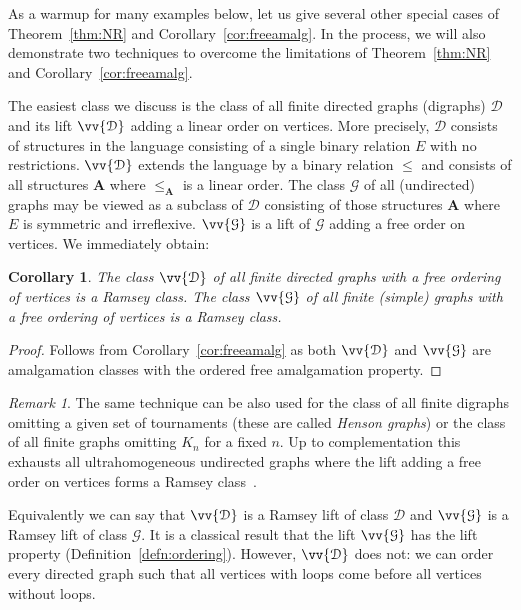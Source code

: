 \documentclass{elsarticle}
\def\ordclass#1{\vv{#1}}
\def\str#1{\mathbf {#1}}
\theoremstyle{plain}
\newtheorem{corollary}[theorem]{Corollary}
\theoremstyle{definition}
\theoremstyle{remark}
\newtheorem*{remark}{Remark}
\begin{document}
As a warmup for many examples below, let us give several other special cases of Theorem~\ref{thm:NR} and Corollary~\ref{cor:freeamalg}. In the process, we will also demonstrate two techniques to overcome the limitations of Theorem~\ref{thm:NR} and Corollary~\ref{cor:freeamalg}.

The easiest class we discuss is the class of all finite directed graphs (digraphs) $\mathcal D$ and its lift $\ordclass {\mathcal D}$ adding a linear order
on vertices. More precisely, $\mathcal D$ consists of structures in the language consisting of a single binary relation $E$ with no restrictions. $\ordclass{\mathcal D}$
extends the language by a binary relation $\leq$ and consists of all structures $\str{A}$ where $\leq_\str{A}$ is a linear order.
The class $\mathcal G$ of all (undirected) graphs may be viewed as a subclass of $\mathcal D$ consisting of those structures $\str{A}$ where $E$ is symmetric and irreflexive.
$\ordclass{\mathcal G}$ is a lift of $\mathcal G$ adding a free order on vertices.
We immediately obtain:
\begin{corollary}
\label{cor:digraphs}
The class $\ordclass{\mathcal {D}}$ of all finite directed graphs with a free ordering of vertices is a Ramsey class.
The class $\ordclass{\mathcal {G}}$ of all finite (simple) graphs with a free ordering of vertices is a Ramsey class.
\end{corollary}
\begin{proof}
Follows from Corollary~\ref{cor:freeamalg} as both $\ordclass{\mathcal {D}}$ and $\ordclass{\mathcal {G}}$ are amalgamation classes with the ordered
free amalgamation property.
\end{proof}
\begin{remark}
The same technique can be also used for the class of all finite digraphs omitting a given set of tournaments
(these are called \emph{Henson graphs}) or the class of all finite graphs omitting $K_n$ for a fixed $n$.
Up to complementation this exhausts all ultrahomogeneous undirected graphs where the lift adding a free order on vertices forms a Ramsey class~\cite{Nevsetvril1989a}.
\end{remark}

Equivalently we can say that $\ordclass{\mathcal {D}}$ is a Ramsey lift of class $\mathcal D$
and $\ordclass{\mathcal {G}}$ is a Ramsey lift of class $\mathcal G$. It is a classical result that the lift $\ordclass{\mathcal {G}}$ has the lift
property (Definition~\ref{defn:ordering}). However, $\ordclass{\mathcal {D}}$
does not: we can order every directed graph such that all vertices with loops come before all vertices without loops.
\end{document}
